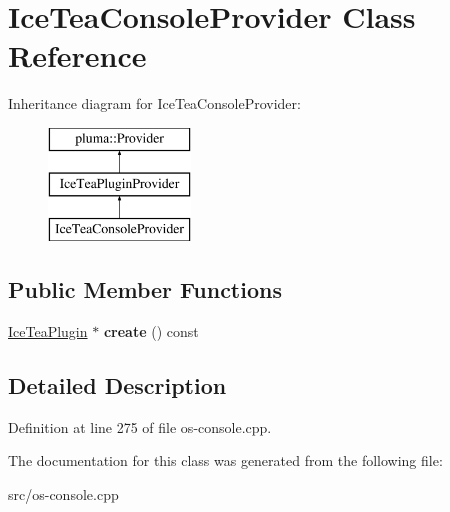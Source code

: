 \hypertarget{class_ice_tea_console_provider}{}\section{Ice\+Tea\+Console\+Provider Class Reference}
\label{class_ice_tea_console_provider}
Inheritance diagram for Ice\+Tea\+Console\+Provider\+:\begin{figure}[H]
\begin{center}
\leavevmode
\includegraphics[height=3.000000cm]{class_ice_tea_console_provider}
\end{center}
\end{figure}
\subsection*{Public Member Functions}
\begin{DoxyCompactItemize}
\item 
\hyperlink{class_ice_tea_plugin}{Ice\+Tea\+Plugin} $\ast$ {\bfseries create} () const \hypertarget{class_ice_tea_console_provider_ab26d7c283fcecda118c795bf91c6e6ab}{}\label{class_ice_tea_console_provider_ab26d7c283fcecda118c795bf91c6e6ab}

\end{DoxyCompactItemize}


\subsection{Detailed Description}


Definition at line 275 of file os-\/console.\+cpp.



The documentation for this class was generated from the following file\+:\begin{DoxyCompactItemize}
\item 
src/os-\/console.\+cpp\end{DoxyCompactItemize}
